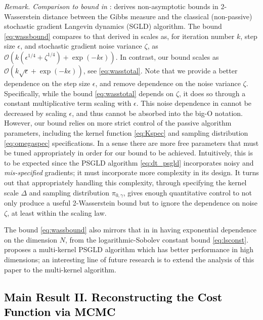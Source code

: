 \documentclass[journal,onecolumn]{IEEEtran}
\newcommand{\step}{\epsilon}
\newcommand{\dimn}{N}
\newcommand{\ids}{\pi}
\newcommand{\idw}{\gamma}
\newcommand{\isp}{0,\idw}
\newcommand{\gradnvar}{\zeta}
\newcommand{\idistrw}{\ids_{\isp}}
\begin{document}
\vspace{0.1cm}
\textit{Remark. Comparison to bound in \cite{raginsky2017non}}: \cite{raginsky2017non} derives non-asymptotic bounds in 2-Wasserstein distance between the Gibbs measure and the classical (non-passive) stochastic gradient Langevin dynamics (SGLD) algorithm. The bound \eqref{eq:wassbound} compares to that derived in \cite{raginsky2017non} scales as, for iteration number $k$, step size $\step$, and stochastic gradient noise variance $\gradnvar$, as $\mathcal{O}(k\left(\step^{1/4} + \gradnvar^{1/4}\right) + \exp(-k\step))$. In contrast, our bound scales as $\mathcal{O}(k\sqrt{\step} + \exp(-k\step))$, see \eqref{eq:wasstotal}. Note that we provide a better dependence on the step size $\step$, and remove dependence on the noise variance $\gradnvar$. {\color{black}Specifically, while the bound \eqref{eq:wasstotal} depends on $\gradnvar$, it does so through a constant multiplicative term scaling with $\step$. This noise dependence in \cite{raginsky2017non} cannot be decreased by scaling $\step$, and thus cannot be absorbed into the big-O notation. However, our bound  relies on more strict control of the passive algorithm parameters, including the kernel function \eqref{eq:Kspec} and sampling distribution \eqref{eq:omegaspec} specifications. In a sense there are more free parameters that must be tuned appropriately in order for our bound to be achieved. Intuitively, this is to be expected since the PSGLD algorithm \eqref{eq:dt_psgld} incorporates noisy and \textit{mis-specified} gradients; it must incorporate more complexity in its design. It turns out that appropriately handling this complexity, through specifying the kernel scale $\Delta$ and sampling distribution $\idistrw$, gives enough quantitative control to not only produce a useful 2-Wasserstein bound but to ignore the dependence on noise $\gradnvar$, at least within the scaling law. }

The bound \eqref{eq:wassbound} also mirrors that in \cite{raginsky2017non} in having exponential dependence on the dimension $\dimn$, from the logarithmic-Sobolev constant bound \eqref{eq:lsconst}. \cite{krishnamurthy2021langevin} proposes a multi-kernel PSGLD algorithm which has better performance in high dimensions; an interesting line of future research is to extend the analysis of this paper to the multi-kernel algorithm. 
\vspace{0.1cm}

\textcolor{black}{\section{Main Result II. Reconstructing the Cost Function via MCMC} \label{sec:cfr}}
\end{document}
